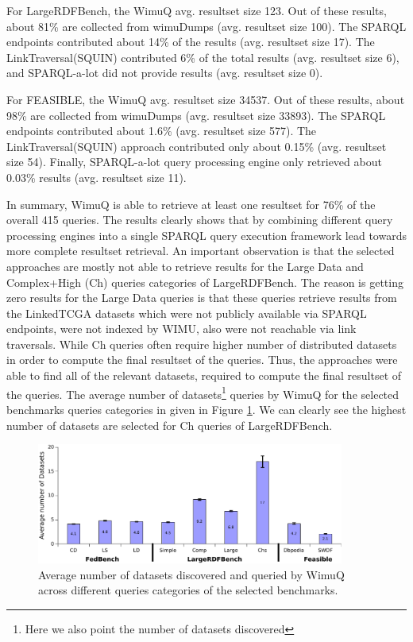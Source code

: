 \documentclass[sw]{iosart2x}
\begin{document}
For LargeRDFBench, the WimuQ avg. resultset size 123. Out of these results, about 81\% are collected from wimuDumps (avg. resultset size 100). The SPARQL endpoints contributed about 14\% of the results (avg. resultset size 17). The LinkTraversal(SQUIN) contributed 6\% of the total results (avg. resultset size 6), and SPARQL-a-lot did not provide results (avg. resultset size 0). 

For FEASIBLE, the WimuQ avg. resultset size \num{34537}. Out of these results, about 98\% are collected from wimuDumps (avg. resultset size \num{33893}). The SPARQL endpoints contributed about 1.6\% (avg. resultset size 577). The LinkTraversal(SQUIN) approach contributed only about 0.15\% (avg. resultset size 54). Finally, SPARQL-a-lot query processing engine only retrieved about 0.03\% results (avg. resultset size 11). 

In summary, WimuQ is able to retrieve at least one resultset for 76\% of the overall 415 queries. The results clearly shows that by combining different query processing engines into a single SPARQL query execution framework lead towards more complete resultset retrieval. 
An important observation is that the selected approaches are mostly not able to retrieve results for the Large Data and Complex+High (Ch) queries categories of LargeRDFBench. The reason is getting zero results for the Large Data queries is that these queries retrieve results from the LinkedTCGA \cite{tcga2013} datasets which were not publicly available via SPARQL endpoints, were not indexed by WIMU, also were not reachable via link traversals. While Ch queries often require higher number of distributed datasets in order to compute the final resultset of the queries. Thus, the approaches were able to find all of the relevant datasets, required to compute the final resultset of the queries. The average number of datasets\footnote{Here we also point the number of datasets discovered} queries by WimuQ for the selected benchmarks queries categories in given in Figure \ref{fig:numberDatasets1}. We can clearly see the highest number of datasets are selected for Ch queries of LargeRDFBench. 

\begin{figure}[htb]
\centering
    \includegraphics[width=0.9\textwidth]{img/numberDatasets1.pdf}
	\caption{Average number of datasets discovered and queried by WimuQ across different queries categories of the selected benchmarks.}
	\label{fig:numberDatasets1}
\end{figure}
\end{document}

